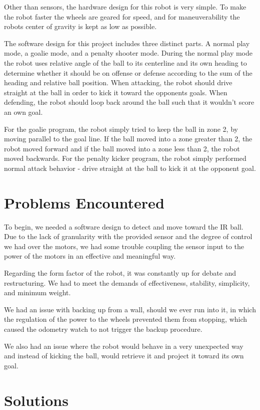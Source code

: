 \documentclass[journal]{../IEEEtran}
\begin{document}
Other than sensors, the hardware design for this robot is very simple. To make the robot faster the wheels are geared for speed, and for maneuverability the robots center of gravity is kept as low as possible.

The software design for this project includes three distinct parts. A normal play mode, a goalie mode, and a penalty shooter mode. During the normal play mode the robot uses relative angle of the ball to its centerline and its own heading to determine whether it should be on offense or defense according to the sum of the heading and relative ball position. When attacking, the robot should drive straight at the ball in order to kick it toward the opponents goals. When defending, the robot should loop back around the ball such that it wouldn't score an own goal.

For the goalie program, the robot simply tried to keep the ball in zone 2, by moving parallel to the goal line. If the ball moved into a zone greater than 2, the robot moved forward and if the ball moved into a zone less than 2, the robot moved backwards. For the penalty kicker program, the robot simply performed normal attack behavior - drive straight at the ball to kick it at the opponent goal.

\section{Problems Encountered}\label{S.problems}

To begin, we needed a software design to detect and move toward the IR ball. Due to the lack of granularity with the provided sensor and the degree of control we had over the motors, we had some trouble coupling the sensor input to the power of the motors in an effective and meaningful way.

Regarding the form factor of the robot, it was constantly up for debate and restructuring. We had to meet the demands of effectiveness, stability, simplicity, and minimum weight.

We had an issue with backing up from a wall, should we ever run into it, in which the regulation of the power to the wheels prevented them from stopping, which caused the odometry watch to not trigger the backup procedure.

We also had an issue where the robot would behave in a very unexpected way and instead of kicking the ball, would retrieve it and project it toward its own goal.

\section{Solutions}\label{S.solutions}
\end{document}

